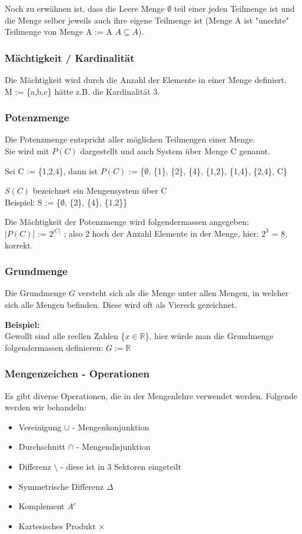 \documentclass[a4paper,12pt]{article}
\begin{document}
Noch zu erwähnen ist, dass die Leere Menge $\emptyset$ teil einer jeden Teilmenge ist und die Menge selber jeweils auch ihre eigene Teilmenge ist (Menge A ist "unechte" Teilmenge von Menge A := A $A \subseteq A$).

\subsubsection{Mächtigkeit / Kardinalität}
Die Mächtigkeit wird durch die Anzahl der Elemente in einer Menge definiert. \\
M := \{a,b,c\} hätte z.B. die Kardinalität 3.

\subsubsection{Potenzmenge}
Die Potenzmenge entspricht aller möglichen Teilmengen einer Menge. \\
Sie wird mit \( P(C) \) dargestellt und auch System über Menge C genannt.

Sei C := \{1,2,4\}, dann ist \( P(C) \) := \{$\emptyset$,  \{1\}, \{2\}, \{4\}, \{1,2\}, \{1,4\}, \{2,4\}, C\}

\( S(C) \) bezeichnet ein Mengensystem über C \\
Beispiel: S := \{$\emptyset$,  \{2\}, \{4\}, \{1,2\}\}

Die Mächtigkeit der Potenzmenge wird folgendermassen angegeben: \\
|\( P(C) \)| := $2^{|C|}$ ; also 2 hoch der Anzahl Elemente in der Menge, hier: $2^{3}$ = 8, korrekt.

\subsubsection{Grundmenge}
Die Grundmenge $G$ versteht sich als die Menge unter allen Mengen, in welcher sich alle Mengen befinden. Diese wird oft als Viereck gezeichnet.

\textbf{Beispiel:} \\
Gewollt sind alle reellen Zahlen \{$x \in \mathbb{R}$\}, hier würde man die Grundmenge folgendermassen definieren: $G := \mathbb{R}$

\subsubsection{Mengenzeichen - Operationen}
Es gibt diverse Operationen, die in der Mengenlehre verwendet werden. Folgende werden wir behandeln:
\begin{itemize}
  \item Vereinigung $\cup$ - Mengenkonjunktion
  \item Durchschnitt $\cap$ - Mengendisjunktion
  \item Differenz $\setminus$ - diese ist in 3 Sektoren eingeteilt
  \item Symmetrische Differenz $\Delta$
  \item Komplement $A^{c}$
  \item Kartesisches Produkt $\times$
\end{itemize}
\end{document}
